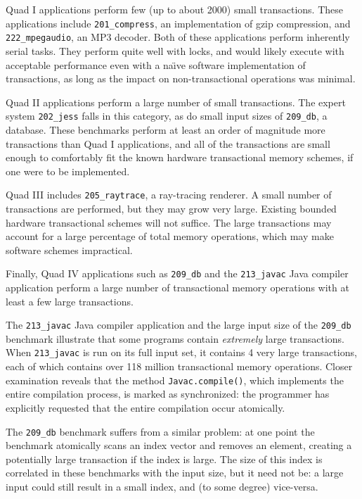 \documentclass[12pt,oneside]{article}
\begin{document}
Quad I applications perform few (up to about 2000) small
transactions.  These applications include \texttt{201\_compress}, an
implementation of gzip compression, and \texttt{222\_mpegaudio}, an
MP3 decoder.  Both of these applications perform inherently serial
tasks.  They perform quite well with locks, and would likely execute
with acceptable performance even with a na\"\i{}ve software
implementation of transactions, as long as the impact on
non-transactional operations was minimal.

Quad II applications perform a large number of small transactions.
The expert system \texttt{202\_jess} falls in this category, as do
small input sizes of \texttt{209\_db}, a database.  These benchmarks
perform at least an order of magnitude more transactions than Quad
I applications, and all of the transactions are small enough to 
comfortably fit the known hardware transactional memory schemes, if
one were to be implemented.

Quad III includes \texttt{205\_raytrace}, a ray-tracing renderer.  A
small number of transactions are performed, but they may grow very
large.  Existing bounded hardware transactional schemes will not
suffice.  The large
transactions may account for a large percentage of total memory
operations, which may make software schemes impractical.

Finally, Quad IV applications such as \texttt{209\_db} and the
\texttt{213\_javac} Java compiler application perform a large number
of transactional memory operations with at least a few large transactions.  

The \texttt{213\_javac} Java compiler application and the large input
size of the \texttt{209\_db} benchmark illustrate that some programs
contain \emph{extremely} large transactions.  When \texttt{213\_javac}
is run on its full input set, it contains 4 very large transactions,
each of which contains over 118 million transactional memory
operations.  Closer
examination reveals that the method \texttt{Javac.compile()}, which
implements the entire compilation process, is marked as synchronized:
the programmer has explicitly requested that the entire compilation
occur atomically.

The \texttt{209\_db} benchmark suffers from a similar problem: at one
point the benchmark atomically scans an index vector and removes an
element, creating a potentially large transaction if the index is
large.  The size of this index is correlated in these benchmarks with
the input size, but it need not be: a large input could still result
in a small index, and (to some degree) vice-versa.
\end{document}
